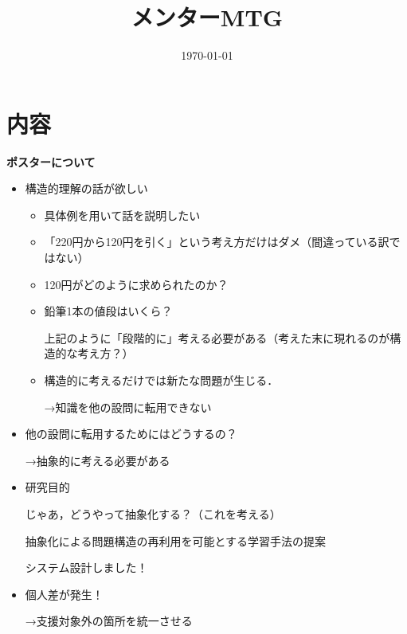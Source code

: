\documentclass[a4paper,12pt]{ltjsarticle}
\title{メンターMTG}
\date{\today}
\begin{document}
  \maketitle

  \section*{内容}

  \textbf{ポスターについて} \par
  \begin{itemize}[label={--}]
    \item 構造的理解の話が欲しい
    \begin{itemize}
      \item 具体例を用いて話を説明したい
      \item 「220円から120円を引く」という考え方だけはダメ（間違っている訳ではない）
      \item 120円がどのように求められたのか？
      \item 鉛筆1本の値段はいくら？ \par
            上記のように「段階的に」考える必要がある（考えた末に現れるのが構造的な考え方？）
      \item 構造的に考えるだけでは新たな問題が生じる． \par
            →知識を他の設問に転用できない \\
    \end{itemize} 
    \item 他の設問に転用するためにはどうするの？ \par
          →抽象的に考える必要がある \\
    \item 研究目的 \par
          じゃあ，どうやって抽象化する？（これを考える） \par
          抽象化による問題構造の再利用を可能とする学習手法の提案 \par
          システム設計しました！ \\
    \item 個人差が発生！ \par
          →支援対象外の箇所を統一させる
  \end{itemize}
\end{document}
